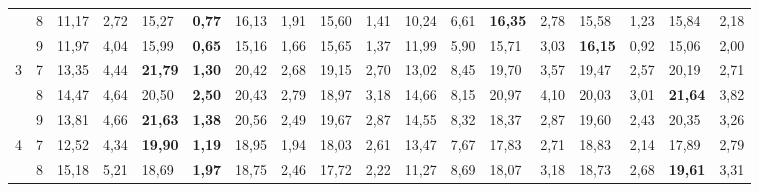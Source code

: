 \documentclass[conference]{IEEEtran}
\begin{document}
\begin{table*}[]
\begin{tabular}{|cl|ll|ll|ll|ll|ll|ll|ll|ll|}
		\multicolumn{1}{|c|}{} & 8 & \multicolumn{1}{l|}{11,17} & 2,72 & \multicolumn{1}{l|}{15,27} & \textbf{0,77} & \multicolumn{1}{l|}{16,13} & 1,91 & \multicolumn{1}{l|}{15,60} & 1,41 & \multicolumn{1}{l|}{10,24} & 6,61 & \multicolumn{1}{l|}{\textbf{16,35}} & 2,78 & \multicolumn{1}{l|}{15,58} & 1,23 & \multicolumn{1}{l|}{15,84} & 2,18 \\ \cline{2-18} 
		\multicolumn{1}{|c|}{} & 9 & \multicolumn{1}{l|}{11,97} & 4,04 & \multicolumn{1}{l|}{15,99} & \textbf{0,65} & \multicolumn{1}{l|}{15,16} & 1,66 & \multicolumn{1}{l|}{15,65} & 1,37 & \multicolumn{1}{l|}{11,99} & 5,90 & \multicolumn{1}{l|}{15,71} & 3,03 & \multicolumn{1}{l|}{\textbf{16,15}} & 0,92 & \multicolumn{1}{l|}{15,06} & 2,00 \\ \hline
		\multicolumn{1}{|c|}{\multirow{3}{*}{3}} & 7 & \multicolumn{1}{l|}{13,35} & 4,44 & \multicolumn{1}{l|}{\textbf{21,79}} & \textbf{1,30} & \multicolumn{1}{l|}{20,42} & 2,68 & \multicolumn{1}{l|}{19,15} & 2,70 & \multicolumn{1}{l|}{13,02} & 8,45 & \multicolumn{1}{l|}{19,70} & 3,57 & \multicolumn{1}{l|}{19,47} & 2,57 & \multicolumn{1}{l|}{20,19} & 2,71 \\ \cline{2-18} 
		\multicolumn{1}{|c|}{} & 8 & \multicolumn{1}{l|}{14,47} & 4,64 & \multicolumn{1}{l|}{20,50} & \textbf{2,50} & \multicolumn{1}{l|}{20,43} & 2,79 & \multicolumn{1}{l|}{18,97} & 3,18 & \multicolumn{1}{l|}{14,66} & 8,15 & \multicolumn{1}{l|}{20,97} & 4,10 & \multicolumn{1}{l|}{20,03} & 3,01 & \multicolumn{1}{l|}{\textbf{21,64}} & 3,82 \\ \cline{2-18} 
		\multicolumn{1}{|c|}{} & 9 & \multicolumn{1}{l|}{13,81} & 4,66 & \multicolumn{1}{l|}{\textbf{21,63}} & \textbf{1,38} & \multicolumn{1}{l|}{20,56} & 2,49 & \multicolumn{1}{l|}{19,67} & 2,87 & \multicolumn{1}{l|}{14,55} & 8,32 & \multicolumn{1}{l|}{18,37} & 2,87 & \multicolumn{1}{l|}{19,60} & 2,43 & \multicolumn{1}{l|}{20,35} & 3,26 \\ \hline
		\multicolumn{1}{|c|}{\multirow{3}{*}{4}} & 7 & \multicolumn{1}{l|}{12,52} & 4,34 & \multicolumn{1}{l|}{\textbf{19,90}} & \textbf{1,19} & \multicolumn{1}{l|}{18,95} & 1,94 & \multicolumn{1}{l|}{18,03} & 2,61 & \multicolumn{1}{l|}{13,47} & 7,67 & \multicolumn{1}{l|}{17,83} & 2,71 & \multicolumn{1}{l|}{18,83} & 2,14 & \multicolumn{1}{l|}{17,89} & 2,79 \\ \cline{2-18} 
		\multicolumn{1}{|c|}{} & 8 & \multicolumn{1}{l|}{15,18} & 5,21 & \multicolumn{1}{l|}{18,69} & \textbf{1,97} & \multicolumn{1}{l|}{18,75} & 2,46 & \multicolumn{1}{l|}{17,72} & 2,22 & \multicolumn{1}{l|}{11,27} & 8,69 & \multicolumn{1}{l|}{18,07} & 3,18 & \multicolumn{1}{l|}{18,73} & 2,68 & \multicolumn{1}{l|}{\textbf{19,61}} & 3,31 \\ \cline{2-18} 

\end{tabular}
\end{table*}
\end{document}
